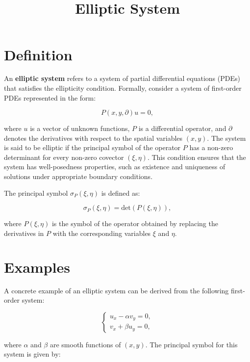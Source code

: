 \documentclass[11pt,a4paper]{article}
\title{Elliptic System}
\date{}
\begin{document}
\maketitle
\section{Definition}
An \textbf{elliptic system} refers to a system of partial differential equations (PDEs) that satisfies the ellipticity condition. Formally, consider a system of first-order PDEs represented in the form:

\begin{equation}
P(x, y, \partial) u = 0,
\end{equation}

where \( u \) is a vector of unknown functions, \( P \) is a differential operator, and \( \partial \) denotes the derivatives with respect to the spatial variables \( (x, y) \). The system is said to be elliptic if the principal symbol of the operator \( P \) has a non-zero determinant for every non-zero covector \( (\xi, \eta) \). This condition ensures that the system has well-posedness properties, such as existence and uniqueness of solutions under appropriate boundary conditions.

The principal symbol \( \sigma_P(\xi, \eta) \) is defined as:

\begin{equation}
\sigma_P(\xi, \eta) = \text{det}(P(\xi, \eta)),
\end{equation}

where \( P(\xi, \eta) \) is the symbol of the operator obtained by replacing the derivatives in \( P \) with the corresponding variables \( \xi \) and \( \eta \).

\section{Examples}
A concrete example of an elliptic system can be derived from the following first-order system:

\begin{equation}
\begin{cases}
u_x - \alpha v_y = 0, \\
v_x + \beta u_y = 0,
\end{cases}
\end{equation}

where \( \alpha \) and \( \beta \) are smooth functions of \( (x, y) \). The principal symbol for this system is given by:
\end{document}
